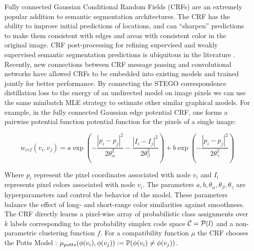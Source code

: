 \documentclass{article} \usepackage{iclr2022_conference,times}
\begin{document}
Fully connected Gaussian Conditional Random Fields (CRFs) \citep{crf} are an extremely popular addition to semantic segmentation architectures. The CRF has the ability to improve initial predictions of locations, and can ``sharpen'' predictions to make them consistent with edges and areas with consistent color in the original image. CRF post-processing for refining supervised and weakly supervised semantic segmentation predictions is ubiquitous in the literature \citep{crf,chen2014semantic,long2015fully,liu2020leveraging,interpixel}. Recently, new connections between CRF message passing and convolutional networks have allowed CRFs to be embedded into existing models \citep{chen2017rethinking,teichmann2018convolutional} and trained jointly for better performance. By connecting the STEGO correspondence distillation loss to the energy of an undirected model on image pixels we can use the same minibatch MLE strategy to estimate other similar graphical models. For example, in the fully connected Gaussian edge potential CRF, one forms a pairwise potential function potential function for the pixels of a single image:

\begin{equation}
    \label{eq:crf}
    w_{crf}(v_i,v_j) = a \exp \left( - \frac{|p_i - p_j|^2}{2 \theta_\alpha^2} - \frac{|I_i - I_j|^2}{2 \theta_\beta^2} \right) + b \exp \left(  - \frac{|p_i - p_j|^2}{2 \theta_\gamma^2} \right)
\end{equation}

Where $p_i$ represent the pixel coordinates associated with node $v_i$ and $I_i$ represents pixel colors associated with node $v_i$. The parameters $a,b,\theta_\alpha,\theta_\beta,\theta_\gamma$ are hyperparameters and control the behavior of the model. These parameters balance the effect of long- and short-range color similarities against smoothness. The CRF directly learns a pixel-wise array of probabilistic class assignments over $k$ labels corresponding to the probability simplex code space $\C = \mathcal{P}(l)$ and a non-parametric clustering function $f$. For a compatibility function $\mu$ the CRF chooses the Potts Model \citep{potts1952some}: $\mu_{potts}(\phi(v_i), \phi(v_j)) := \P(\phi(v_i) \neq \phi(v_j))$. 
\end{document}
